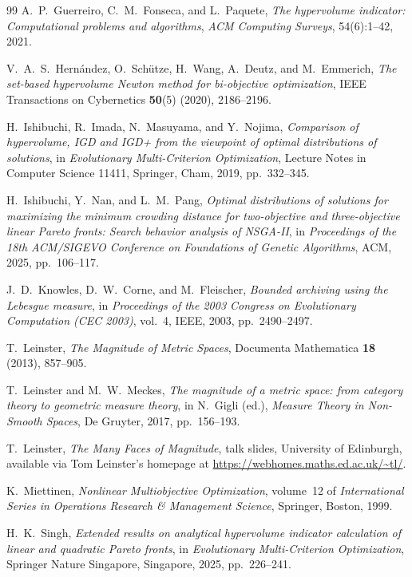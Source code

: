 \documentclass{article}
\theoremstyle{definition}
\newcommand{\1}{\mathbf{1}}
\begin{document}
\begin{thebibliography}{99}
A.~P.~Guerreiro, C.~M.~Fonseca, and L.~Paquete,
\emph{The hypervolume indicator: Computational problems and algorithms},
\emph{ACM Computing Surveys}, 54(6):1--42, 2021.

V.~A.~S.~Hern\'andez, O.~Sch{\"u}tze, H.~Wang, A.~Deutz, and M.~Emmerich,
\emph{The set-based hypervolume Newton method for bi-objective optimization},
IEEE Transactions on Cybernetics \textbf{50}(5) (2020), 2186--2196.

H.~Ishibuchi, R.~Imada, N.~Masuyama, and Y.~Nojima,
\emph{Comparison of hypervolume, IGD and IGD+ from the viewpoint of optimal distributions of solutions},
in \emph{Evolutionary Multi-Criterion Optimization}, Lecture Notes in Computer Science 11411, Springer, Cham, 2019, pp.~332--345.

H.~Ishibuchi, Y.~Nan, and L.~M.~Pang,
\emph{Optimal distributions of solutions for maximizing the minimum crowding distance for two-objective and three-objective linear Pareto fronts: Search behavior analysis of NSGA-II},
in \emph{Proceedings of the 18th ACM/SIGEVO Conference on Foundations of Genetic Algorithms}, ACM, 2025, pp.~106--117.

J.~D.~Knowles, D.~W.~Corne, and M.~Fleischer,
\emph{Bounded archiving using the Lebesgue measure},
in \emph{Proceedings of the 2003 Congress on Evolutionary Computation (CEC 2003)}, vol.~4, IEEE, 2003, pp.~2490--2497.

T.~Leinster,
\emph{The Magnitude of Metric Spaces},
Documenta Mathematica \textbf{18} (2013), 857--905.

T.~Leinster and M.~W.~Meckes,
\emph{The magnitude of a metric space: from category theory to geometric measure theory},
in N.~Gigli (ed.), \emph{Measure Theory in Non-Smooth Spaces}, De Gruyter, 2017, pp.~156--193.

T.~Leinster,
\emph{The Many Faces of Magnitude},
talk slides, University of Edinburgh, available via Tom Leinster's homepage at \url{https://webhomes.maths.ed.ac.uk/~tl/}.

K.~Miettinen,
\emph{Nonlinear Multiobjective Optimization},
volume~12 of \emph{International Series in Operations Research \& Management Science}, Springer, Boston, 1999.

H.~K.~Singh,
\emph{Extended results on analytical hypervolume indicator calculation of linear and quadratic Pareto fronts},
in \emph{Evolutionary Multi-Criterion Optimization}, Springer Nature Singapore, Singapore, 2025, pp.~226--241.


\end{thebibliography}
\end{document}
